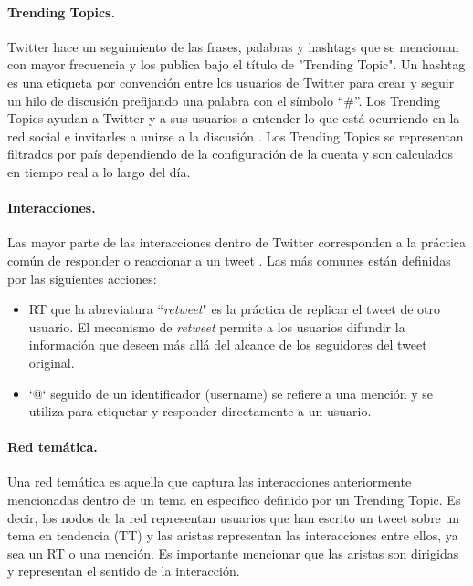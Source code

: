 \paragraph{Trending Topics.}
Twitter hace un seguimiento de las frases, palabras y hashtags que se mencionan con mayor frecuencia y los publica bajo el título de "Trending Topic". Un hashtag es una etiqueta por convención entre los usuarios de Twitter para crear y seguir un hilo de discusión prefijando una palabra con el símbolo “\#”. Los Trending Topics ayudan a Twitter y a sus usuarios a entender lo que está ocurriendo en la red social e invitarles a unirse a la discusión \cite{twitter_twittercom_nodate}. Los Trending Topics se representan filtrados por país dependiendo de la configuración de la cuenta y son calculados en tiempo real a lo largo del día. 

\paragraph{Interacciones.} Las mayor parte de las interacciones dentro de Twitter corresponden a la práctica común de responder o reaccionar a un tweet \cite{kwak_what_2010}. Las más comunes están definidas por las siguientes acciones: 
\begin{itemize}
    \item RT que la abreviatura “\textit{retweet}" es la práctica de replicar el tweet de otro usuario. El mecanismo de \textit{retweet} permite a los usuarios difundir la información que deseen más allá del alcance de los seguidores del tweet original.

    \item ‘@‘ seguido de un identificador (username) se refiere a una mención y se utiliza para etiquetar y responder directamente a un usuario.
\end{itemize}

\paragraph{Red temática.} Una red temática es aquella que captura las interacciones anteriormente mencionadas dentro de un tema en especifico definido por un Trending Topic. Es decir, los nodos de la red representan usuarios que han escrito un tweet sobre un tema en tendencia (TT) y las aristas representan las interacciones entre ellos, ya sea un RT o una mención. Es importante mencionar que las aristas son dirigidas y representan el sentido de la interacción.

